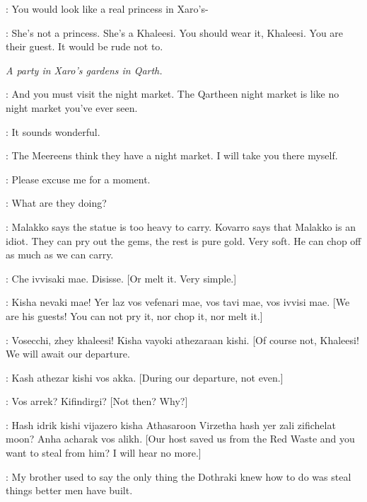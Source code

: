 \DOREAH: You would look like a real princess in Xaro's- 

\IRRI: She's not a princess. She's a Khaleesi. You should wear it, Khaleesi. You are their guest. It would be rude not to. 



\scene

\textit{A party in Xaro's gardens in Qarth.} 


\QARTHEENWOMAN: And you must visit the night market. The Qartheen night market is like no night market you've ever seen. 

\DAENERYS: It sounds wonderful. 

\QARTHEENWOMAN: The Meereens think they have a night market. I will take you there myself. 


\DAENERYS: Please excuse me for a moment. 


\DAENERYS: What are they doing? 

\JORAH: Malakko says the statue is too heavy to carry. Kovarro says that Malakko is an idiot. They can pry out the gems, the rest is pure gold. Very soft. He can chop off as much as we can carry. 

\KOVARRO: Che ivvisaki mae. Disisse. [Or melt it. Very simple.] 

\DAENERYS: Kisha nevaki mae! Yer laz vos vefenari mae, vos tavi mae, vos ivvisi mae. [We are his guests! You can not pry it, nor chop it, nor melt it.] 

\KOVARRO: Vosecchi, zhey khaleesi! Kisha vayoki athezaraan kishi. [Of course not, Khaleesi! We will await our departure. 

\DAENERYS: Kash athezar kishi vos akka. [During our departure, not even.] 

\KOVARRO: Vos arrek? Kifindirgi? [Not then? Why?] 

\DAENERYS: Hash idrik kishi vijazero kisha Athasaroon Virzetha hash yer zali zifichelat moon? Anha acharak vos alikh. [Our host saved us from the Red Waste and you want to steal from him? I will hear no more.] 


\DAENERYS: My brother used to say the only thing the Dothraki knew how to do was steal things better men have built. 

